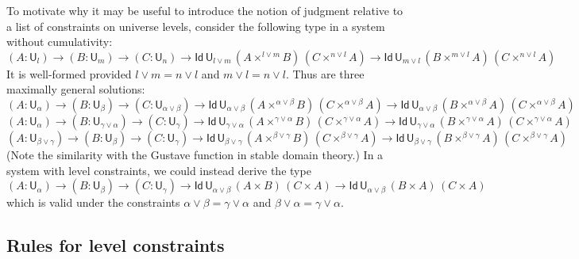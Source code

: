 \documentclass[11pt,a4paper]{article}
\newcommand{\Id}{\mathsf{Id}}
\def\UU{\mathsf{U}}
\begin{document}
To motivate why it may be useful to introduce the notion of judgment relative to a list of constraints on universe levels, consider the following type in a system without cumulativity:
%
$$
    (A : \UU_l) \to (B : \UU_m) \to (C : \UU_n) 
    \to \Id\,\UU_{l \vee m}\, (A\times^{l \vee m} B)\,(C \times^{n \vee l} A)
    \to \Id\,\UU_{m \vee l} \, (B\times^{m \vee l} A)\,(C \times^{n \vee l} A)
$$
It is well-formed provided $l \vee m = n \vee l$ and $m \vee l = n \vee l$. Thus are three maximally general solutions: 
$$
    (A : \UU_\alpha) \to (B : \UU_\beta) \to (C : \UU_{\alpha \vee \beta}) 
    \to \Id\,\UU_{\alpha \vee \beta}\, (A\times^{\alpha \vee \beta} B)\,(C \times^{\alpha \vee \beta} A)
    \to \Id\,\UU_{\alpha \vee \beta}\, (B\times^{\alpha \vee \beta} A)\,(C \times^{\alpha \vee \beta} A)
$$
$$
    (A : \UU_\alpha) \to (B : \UU_{\gamma \vee \alpha}) \to (C : \UU_{\gamma}) 
    \to \Id\,\UU_{\gamma \vee \alpha}\, (A\times^{\gamma \vee \alpha} B)\,(C \times^{\gamma \vee \alpha} A)
    \to \Id\,\UU_{\gamma \vee \alpha}\, (B\times^{\gamma \vee \alpha} A)\,(C \times^{\gamma \vee \alpha} A)
$$
$$
    (A : \UU_{\beta \vee \gamma}) \to (B : \UU_{\beta}) \to (C : \UU_{\gamma}) 
    \to \Id\,\UU_{\beta \vee \gamma}\, (A\times^{\beta \vee \gamma} B)\,(C \times^{\beta \vee \gamma} A)
    \to \Id\,\UU_{\beta \vee \gamma}\, (B\times^{\beta \vee \gamma} A)\,(C \times^{\beta \vee \gamma} A)
$$
(Note the similarity with the Gustave function in stable domain theory.)
In a system with level constraints, we could instead derive the type
$$
    (A : \UU_\alpha) \to (B : \UU_\beta) \to (C : \UU_\gamma) 
    \to \Id\,\UU_{\alpha \vee \beta}\, (A\times B)\,(C \times A)
    \to \Id\,\UU_{\alpha \vee \beta}\, (B\times A)\,(C \times A)
$$
which is valid under the constraints
$
\alpha \vee \beta = \gamma \vee \alpha
$
and 
$
\beta \vee \alpha = \gamma \vee \alpha.
$

\subsection{Rules for level constraints}
\end{document}
